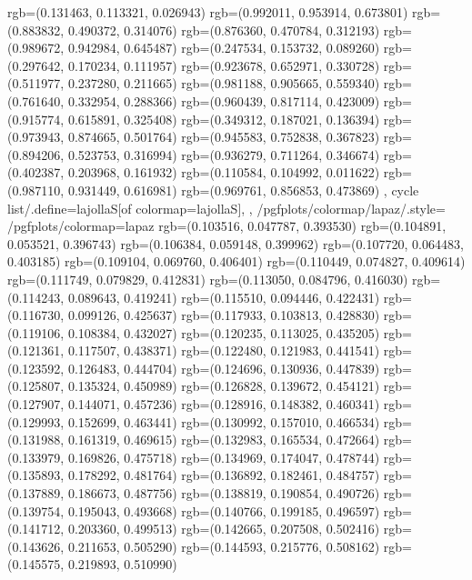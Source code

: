 {{{					rgb=(0.131463, 0.113321, 0.026943)
					rgb=(0.992011, 0.953914, 0.673801)
					rgb=(0.883832, 0.490372, 0.314076)
					rgb=(0.876360, 0.470784, 0.312193)
					rgb=(0.989672, 0.942984, 0.645487)
					rgb=(0.247534, 0.153732, 0.089260)
					rgb=(0.297642, 0.170234, 0.111957)
					rgb=(0.923678, 0.652971, 0.330728)
					rgb=(0.511977, 0.237280, 0.211665)
					rgb=(0.981188, 0.905665, 0.559340)
					rgb=(0.761640, 0.332954, 0.288366)
					rgb=(0.960439, 0.817114, 0.423009)
					rgb=(0.915774, 0.615891, 0.325408)
					rgb=(0.349312, 0.187021, 0.136394)
					rgb=(0.973943, 0.874665, 0.501764)
					rgb=(0.945583, 0.752838, 0.367823)
					rgb=(0.894206, 0.523753, 0.316994)
					rgb=(0.936279, 0.711264, 0.346674)
					rgb=(0.402387, 0.203968, 0.161932)
					rgb=(0.110584, 0.104992, 0.011622)
					rgb=(0.987110, 0.931449, 0.616981)
					rgb=(0.969761, 0.856853, 0.473869)
			},
		cycle list/.define={lajollaS}{[of colormap=lajollaS]},
		},
		/pgfplots/colormap/lapaz/.style={
			/pgfplots/colormap={lapaz}{%
					rgb=(0.103516, 0.047787, 0.393530)
					rgb=(0.104891, 0.053521, 0.396743)
					rgb=(0.106384, 0.059148, 0.399962)
					rgb=(0.107720, 0.064483, 0.403185)
					rgb=(0.109104, 0.069760, 0.406401)
					rgb=(0.110449, 0.074827, 0.409614)
					rgb=(0.111749, 0.079829, 0.412831)
					rgb=(0.113050, 0.084796, 0.416030)
					rgb=(0.114243, 0.089643, 0.419241)
					rgb=(0.115510, 0.094446, 0.422431)
					rgb=(0.116730, 0.099126, 0.425637)
					rgb=(0.117933, 0.103813, 0.428830)
					rgb=(0.119106, 0.108384, 0.432027)
					rgb=(0.120235, 0.113025, 0.435205)
					rgb=(0.121361, 0.117507, 0.438371)
					rgb=(0.122480, 0.121983, 0.441541)
					rgb=(0.123592, 0.126483, 0.444704)
					rgb=(0.124696, 0.130936, 0.447839)
					rgb=(0.125807, 0.135324, 0.450989)
					rgb=(0.126828, 0.139672, 0.454121)
					rgb=(0.127907, 0.144071, 0.457236)
					rgb=(0.128916, 0.148382, 0.460341)
					rgb=(0.129993, 0.152699, 0.463441)
					rgb=(0.130992, 0.157010, 0.466534)
					rgb=(0.131988, 0.161319, 0.469615)
					rgb=(0.132983, 0.165534, 0.472664)
					rgb=(0.133979, 0.169826, 0.475718)
					rgb=(0.134969, 0.174047, 0.478744)
					rgb=(0.135893, 0.178292, 0.481764)
					rgb=(0.136892, 0.182461, 0.484757)
					rgb=(0.137889, 0.186673, 0.487756)
					rgb=(0.138819, 0.190854, 0.490726)
					rgb=(0.139754, 0.195043, 0.493668)
					rgb=(0.140766, 0.199185, 0.496597)
					rgb=(0.141712, 0.203360, 0.499513)
					rgb=(0.142665, 0.207508, 0.502416)
					rgb=(0.143626, 0.211653, 0.505290)
					rgb=(0.144593, 0.215776, 0.508162)
					rgb=(0.145575, 0.219893, 0.510990)
}}}
